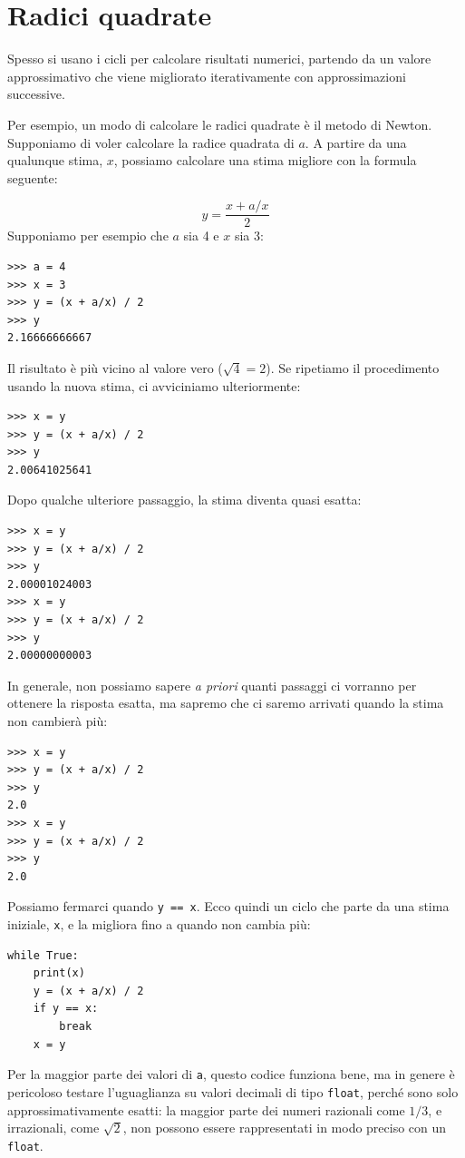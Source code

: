 \documentclass[10pt]{book}
\begin{document}
\section{Radici quadrate}
\label{squareroot}

Spesso si usano i cicli per calcolare risultati numerici, partendo da un valore approssimativo che viene migliorato iterativamente con approssimazioni successive.

Per esempio, un modo di calcolare le radici quadrate è il metodo di Newton. Supponiamo di voler calcolare la radice quadrata di $a$. A partire da una qualunque stima, $x$, possiamo calcolare una stima migliore con la formula seguente:

\[ y = \frac{x + a/x}{2} \]
%
Supponiamo per esempio che $a$ sia 4 e $x$ sia 3:

\begin{verbatim}
>>> a = 4
>>> x = 3
>>> y = (x + a/x) / 2
>>> y
2.16666666667
\end{verbatim}
%
Il risultato è più vicino al valore vero ($\sqrt{4} = 2$).  Se ripetiamo il procedimento usando la nuova stima, ci avviciniamo ulteriormente:

\begin{verbatim}
>>> x = y
>>> y = (x + a/x) / 2
>>> y
2.00641025641
\end{verbatim}
%
Dopo qualche ulteriore passaggio, la stima diventa quasi esatta:

\begin{verbatim}
>>> x = y
>>> y = (x + a/x) / 2
>>> y
2.00001024003
>>> x = y
>>> y = (x + a/x) / 2
>>> y
2.00000000003
\end{verbatim}
%
In generale, non possiamo sapere {\em a priori} quanti passaggi ci vorranno per ottenere la risposta esatta, ma sapremo che ci saremo arrivati quando la stima non cambierà più:

\begin{verbatim}
>>> x = y
>>> y = (x + a/x) / 2
>>> y
2.0
>>> x = y
>>> y = (x + a/x) / 2
>>> y
2.0
\end{verbatim}
%
Possiamo fermarci quando {\tt y == x}.  Ecco quindi un ciclo che parte da una stima iniziale, {\tt x}, e la migliora fino a quando non cambia più:

\begin{verbatim}
while True:
    print(x)
    y = (x + a/x) / 2
    if y == x:
        break
    x = y
\end{verbatim}
%
Per la maggior parte dei valori di {\tt a}, questo codice funziona bene, ma in genere è pericoloso testare l'uguaglianza su valori decimali di tipo {\tt float},
perché sono solo approssimativamente esatti: la maggior parte dei numeri razionali come $1/3$, e irrazionali, come $\sqrt{2}$, non possono essere rappresentati in modo preciso con un {\tt float}.
\end{document}
